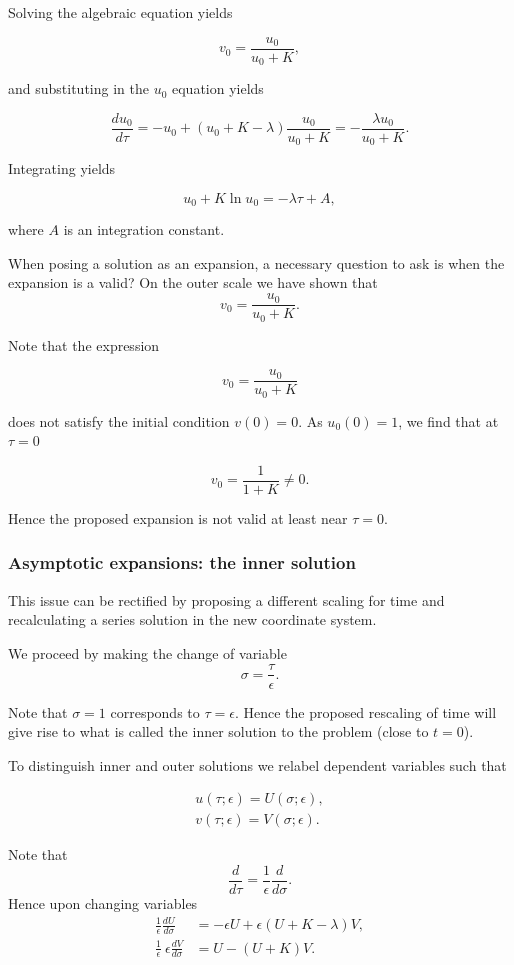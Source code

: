 \documentclass[
  letterpaper,
  DIV=11,
  numbers=noendperiod]{scrreprt}
\begin{document}
Solving the algebraic equation yields

\[
v_0=\frac{u_0}{u_0+K},
\]

and substituting in the \(u_0\) equation yields

\[
\frac{du_0}{d\tau} = -u_0+ (u_0+ K-\lambda)\frac{u_0}{u_0+K} = -\frac{\lambda u_0}{u_0+K}.
\]

Integrating yields

\[
u_0+K\ln u_0=-\lambda \tau +A,
\]

where \(A\) is an integration constant.

When posing a solution as an expansion, a necessary question to ask is
when the expansion is a valid? On the outer scale we have shown that \[
v_0=\frac{u_0}{u_0+K}.
\]

Note that the expression

\[
v_0=\frac{u_0}{u_0+K}
\]

does not satisfy the initial condition \(v(0)=0\). As \(u_0(0)=1\), we
find that at \(\tau=0\)

\[
v_0=\frac{1}{1+K} \neq 0.
\]

Hence the proposed expansion is not valid at least near \(\tau=0\).

\hypertarget{asymptotic-expansions-the-inner-solution}{%
\subsubsection{Asymptotic expansions: the inner
solution}\label{asymptotic-expansions-the-inner-solution}}

This issue can be rectified by proposing a different scaling for time
and recalculating a series solution in the new coordinate system.

We proceed by making the change of variable \[
\sigma=\frac{\tau}{\epsilon}.
\]

Note that \(\sigma=1\) corresponds to \(\tau=\epsilon\). Hence the
proposed rescaling of time will give rise to what is called the inner
solution to the problem (close to \(t=0\)).

To distinguish inner and outer solutions we relabel dependent variables
such that

\[
\begin{aligned}
u(\tau;\epsilon)=U(\sigma;\epsilon),  \nonumber \\ 
v(\tau;\epsilon)=V(\sigma;\epsilon). \nonumber 
\end{aligned}
\]

Note that \[
\frac{d}{d\tau}=\frac{1}{\epsilon}\frac{d}{d\sigma}.
\] Hence upon changing variables \[
\begin{aligned}
\frac{1}{\epsilon}\frac{d U}{d\sigma} &= -\epsilon U+ \epsilon (U+K-\lambda)V, \nonumber \\
\frac{1}{\epsilon}\ \epsilon \frac{d V}{d\sigma} &= U-(U+K)V.  
\end{aligned}
\]
\end{document}

